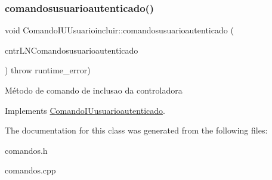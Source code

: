\subsubsection{\texorpdfstring{comandosusuarioautenticado()}{comandosusuarioautenticado()}}
{\footnotesize\ttfamily void Comando\+I\+U\+Usuarioincluir\+::comandosusuarioautenticado (\begin{DoxyParamCaption}\item[{\hyperlink{classILNComandosusuarioautenticado}{I\+L\+N\+Comandosusuarioautenticado} $\ast$}]{cntr\+L\+N\+Comandosusuarioautenticado }\end{DoxyParamCaption}) throw  runtime\+\_\+error) \hspace{0.3cm}{\ttfamily [virtual]}}

Método de comando de inclusao da controladora 

Implements \hyperlink{classComandoIUusuarioautenticado}{Comando\+I\+Uusuarioautenticado}.



The documentation for this class was generated from the following files\+:\begin{DoxyCompactItemize}
\item 
comandos.\+h\item 
comandos.\+cpp\end{DoxyCompactItemize}
